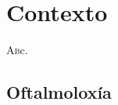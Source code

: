 \chapter{Contexto}
\label{chap:contexto}

\lettrine{A} bc.

\section{Oftalmoloxía}
\label{sec:Oftalmoloxía}